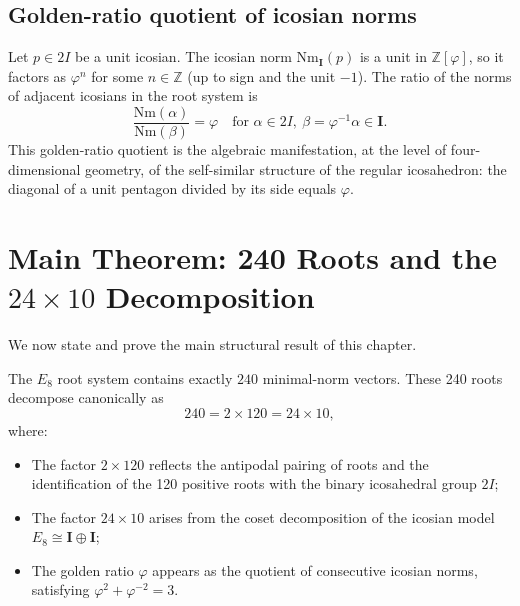\subsection{Golden-ratio quotient of icosian norms}
\label{subsec:icosian-goldenratio}

Let \(p \in 2I\) be a unit icosian.  The icosian norm
\(\mathrm{Nm}_\mathbf{I}(p)\) is a unit in \(\mathbb{Z}[\varphi]\),
so it factors as \(\varphi^n\) for some \(n \in \mathbb{Z}\) (up to
sign and the unit \(-1\)).  The ratio of the norms of adjacent
icosians in the root system is
\[
  \frac{\mathrm{Nm}(\alpha)}{\mathrm{Nm}(\beta)} = \varphi
  \quad \text{for } \alpha \in 2I,\ \beta = \varphi^{-1}\alpha \in \mathbf{I}.
\]
This golden-ratio quotient is the algebraic manifestation, at the
level of four-dimensional geometry, of the self-similar structure of
the regular icosahedron: the diagonal of a unit pentagon divided by
its side equals \(\varphi\).

\section{Main Theorem: 240 Roots and the \texorpdfstring{$24\times10$}{24×10} Decomposition}
\label{sec:e8-theorem}

We now state and prove the main structural result of this chapter.

\begin{theorem}
\label{thm:e8-240roots}
The \(E_8\) root system contains exactly \(240\) minimal-norm
vectors.  These 240 roots decompose canonically as
\[
  240 = 2 \times 120 = 24 \times 10,
\]
where:
\begin{itemize}
  \item The factor \(2 \times 120\) reflects the antipodal pairing
    of roots and the identification of the 120 positive roots with
    the binary icosahedral group \(2I\);
  \item The factor \(24 \times 10\) arises from the coset
    decomposition of the icosian model
    \(E_8 \cong \mathbf{I} \oplus \mathbf{I}\);
  \item The golden ratio \(\varphi\) appears as the quotient of
    consecutive icosian norms, satisfying
    \(\varphi^2 + \varphi^{-2} = 3\).
\end{itemize}
\end{theorem}

